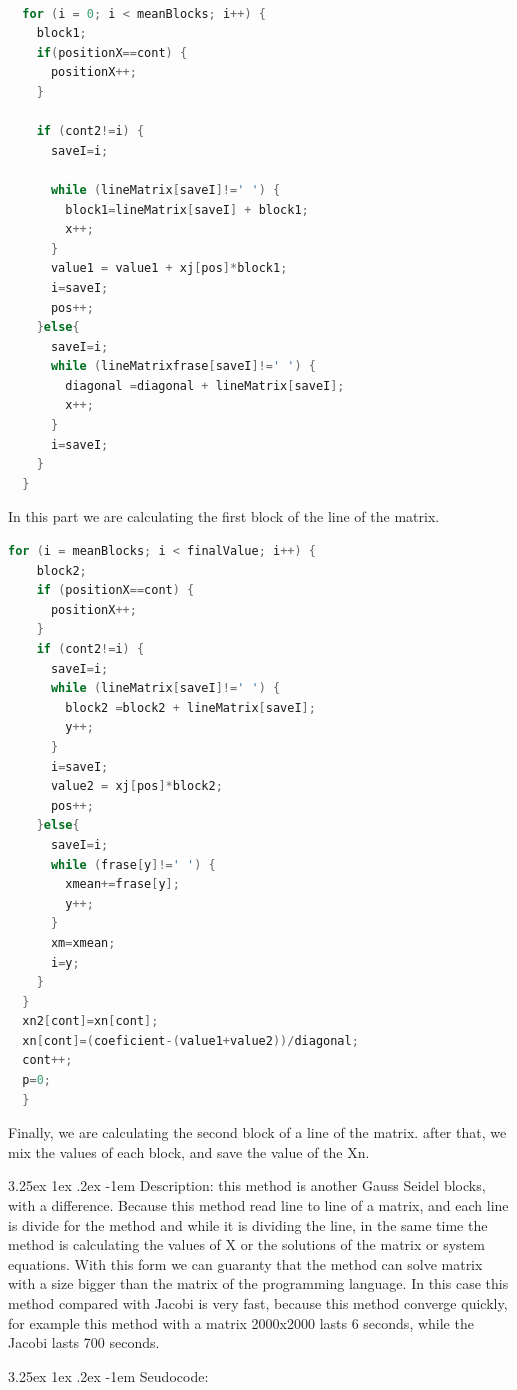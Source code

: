 \documentclass{article}
\makeatletter
\renewcommand\paragraph{\@startsection{paragraph}{5}{\z@}%
  {3.25ex \@plus1ex \@minus.2ex}%
  {-1em}%
  {\normalfont\normalsize\bfseries}}
\makeatother
\begin{document}
\begin{lstlisting}[language=C]

  for (i = 0; i < meanBlocks; i++) {
    block1;
    if(positionX==cont) {
      positionX++;
    }

    if (cont2!=i) {
      saveI=i;

      while (lineMatrix[saveI]!=' ') {
        block1=lineMatrix[saveI] + block1;
        x++;
      }
      value1 = value1 + xj[pos]*block1;
      i=saveI;
      pos++;
    }else{
      saveI=i;
      while (lineMatrixfrase[saveI]!=' ') {
        diagonal =diagonal + lineMatrix[saveI];
        x++;
      }
      i=saveI;
    }
  }
\end{lstlisting}
In this part we are calculating the first block of the line of the matrix.
\begin{lstlisting}[language=C]
  for (i = meanBlocks; i < finalValue; i++) {
    block2;
    if (positionX==cont) {
      positionX++;
    }
    if (cont2!=i) {
      saveI=i;
      while (lineMatrix[saveI]!=' ') {
        block2 =block2 + lineMatrix[saveI];
        y++;
      }
      i=saveI;
      value2 = xj[pos]*block2;
      pos++;
    }else{
      saveI=i;
      while (frase[y]!=' ') {
        xmean+=frase[y];
        y++;
      }
      xm=xmean;
      i=y;
    }
  }
  xn2[cont]=xn[cont];
  xn[cont]=(coeficient-(value1+value2))/diagonal;
  cont++;
  p=0;
  }
\end{lstlisting}
Finally, we are calculating the second block of a line of the matrix. after that, we mix the values of each block, and save the value of the Xn.

\paragraph{Description:}
\hfill \break
this method is another Gauss Seidel blocks, with a difference. Because this method read line to line of a matrix, and each line is divide for the method and while it is dividing the line, in the same time the method is calculating the values of X or the solutions of the matrix or system equations. With this form we can guaranty that the method can solve matrix with a size bigger than the matrix of the programming language. In this case this method compared with Jacobi is very fast,  because this method converge quickly, for example this method with a matrix 2000x2000 lasts 6 seconds, while the Jacobi lasts 700 seconds.

\paragraph{Seudocode:}
\hfill \break 
\end{document}
